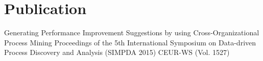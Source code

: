 \section{Publication}
\sectionspace %
Generating Performance Improvement Suggestions by using Cross-Organizational Process Mining
Proceedings of the 5th International Symposium on Data-driven Process Discovery and Analysis (SIMPDA 2015)
CEUR-WS (Vol. 1527)
